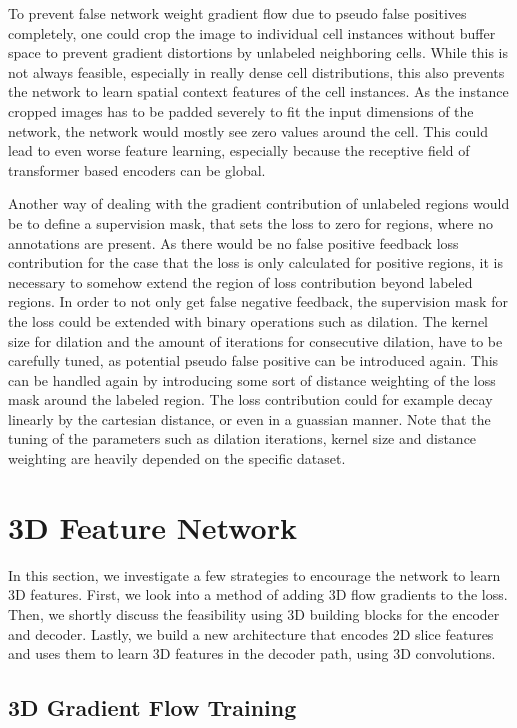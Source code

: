 To prevent false network weight gradient flow due to pseudo false positives completely, one could crop the image to individual cell instances without buffer space to prevent gradient distortions by unlabeled neighboring cells. While this is not always feasible, especially in really dense cell distributions, this also prevents the network to learn spatial context features of the cell instances. As the instance cropped images has to be padded severely to fit the input dimensions of the network, the network would mostly see zero values around the cell. This could lead to even worse feature learning, especially because the receptive field of transformer based encoders can be global.

Another way of dealing with the gradient contribution of unlabeled regions would be to define a supervision mask, that sets the loss to zero for regions, where no annotations are present. As there would be no false positive feedback loss contribution for the case that the loss is only calculated for positive regions, it is necessary to somehow extend the region of loss contribution beyond labeled regions. In order to not only get false negative feedback, the supervision mask for the loss could be extended with binary operations such as dilation. The kernel size for dilation and the amount of iterations for consecutive dilation, have to be carefully tuned, as potential pseudo false positive can be introduced again. This can be handled again by introducing some sort of distance weighting of the loss mask around the labeled region. The loss contribution could for example decay linearly by the cartesian distance, or even in a guassian manner. Note that the tuning of the parameters such as dilation iterations, kernel size and distance weighting are heavily depended on the specific dataset.




\section{3D Feature Network}

In this section, we investigate a few strategies to encourage the network to learn 3D features. First, we look into a method of adding 3D flow gradients to the loss. Then, we shortly discuss the feasibility using 3D building blocks for the encoder and decoder. Lastly, we build a new architecture that encodes 2D slice features and uses them to learn 3D features in the decoder path, using 3D convolutions. 

\subsection{3D Gradient Flow Training}

